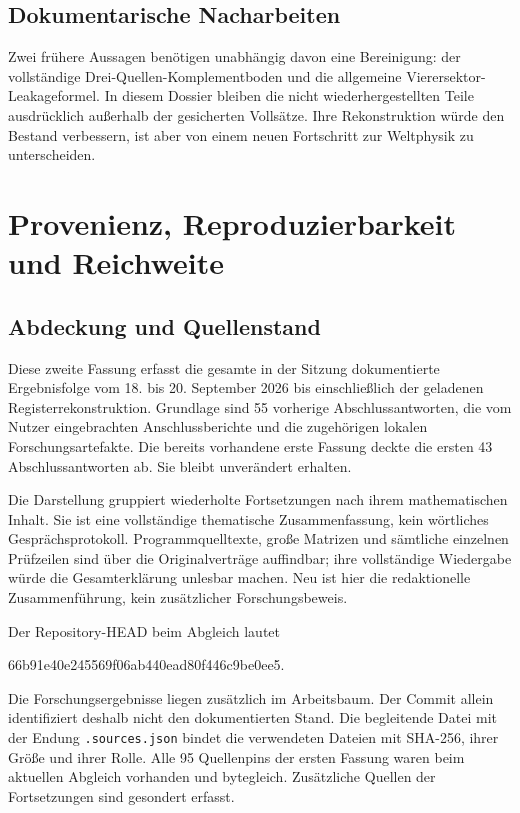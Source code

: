 \documentclass[11pt,a4paper,oneside,parskip=half,headings=normal,numbers=noenddot,bibliography=totoc]{scrreprt}
\begin{document}
\section{Dokumentarische Nacharbeiten}
Zwei frühere Aussagen benötigen unabhängig davon eine Bereinigung: der vollständige Drei-Quellen-Komplementboden und die allgemeine Vierersektor-Leakageformel. In diesem Dossier bleiben die nicht wiederhergestellten Teile ausdrücklich außerhalb der gesicherten Vollsätze. Ihre Rekonstruktion würde den Bestand verbessern, ist aber von einem neuen Fortschritt zur Weltphysik zu unterscheiden.

\chapter{Provenienz, Reproduzierbarkeit und Reichweite}
\section{Abdeckung und Quellenstand}
Diese zweite Fassung erfasst die gesamte in der Sitzung dokumentierte Ergebnisfolge vom 18. bis 20. September 2026 bis einschließlich der geladenen Registerrekonstruktion. Grundlage sind 55 vorherige Abschlussantworten, die vom Nutzer eingebrachten Anschlussberichte und die zugehörigen lokalen Forschungsartefakte. Die bereits vorhandene erste Fassung deckte die ersten 43 Abschlussantworten ab. Sie bleibt unverändert erhalten.

Die Darstellung gruppiert wiederholte Fortsetzungen nach ihrem mathematischen Inhalt. Sie ist eine vollständige thematische Zusammenfassung, kein wörtliches Gesprächsprotokoll. Programmquelltexte, große Matrizen und sämtliche einzelnen Prüfzeilen sind über die Originalverträge auffindbar; ihre vollständige Wiedergabe würde die Gesamterklärung unlesbar machen. Neu ist hier die redaktionelle Zusammenführung, kein zusätzlicher Forschungsbeweis.

Der Repository-HEAD beim Abgleich lautet
\begin{center}\small\ttfamily 66b91e40e245569f06ab440ead80f446c9be0ee5.\end{center}
Die Forschungsergebnisse liegen zusätzlich im Arbeitsbaum. Der Commit allein identifiziert deshalb nicht den dokumentierten Stand. Die begleitende Datei mit der Endung \texttt{.sources.json} bindet die verwendeten Dateien mit SHA-256, ihrer Größe und ihrer Rolle. Alle 95 Quellenpins der ersten Fassung waren beim aktuellen Abgleich vorhanden und bytegleich. Zusätzliche Quellen der Fortsetzungen sind gesondert erfasst.
\end{document}
